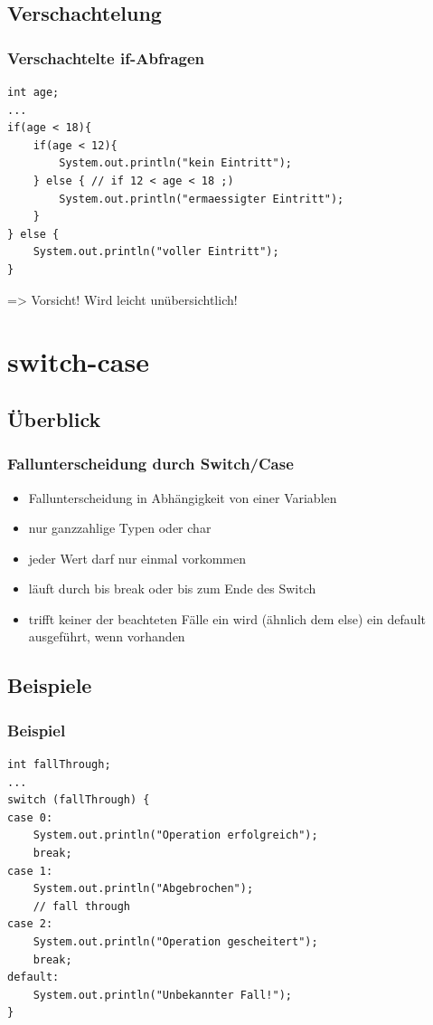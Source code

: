 \documentclass[final]{beamer}
\begin{document}
\subsection{Verschachtelung}
\begin{frame}[containsverbatim]
	\frametitle{Verschachtelte if-Abfragen}
	\begin{lstlisting}
int age;
...
if(age < 18){
	if(age < 12){
		System.out.println("kein Eintritt");
	} else { // if 12 < age < 18 ;)
		System.out.println("ermaessigter Eintritt");
	}
} else {
	System.out.println("voller Eintritt");
}
	\end{lstlisting}
	=> Vorsicht! Wird leicht unübersichtlich!
\end{frame}

\section{switch-case}
\subsection{Überblick}
\begin{frame}[containsverbatim]
	\frametitle{Fallunterscheidung durch Switch/Case}
	\begin{itemize}
		\item{Fallunterscheidung in Abhängigkeit von einer Variablen}
		\item{nur ganzzahlige Typen oder char}
		\item{jeder Wert darf nur einmal vorkommen}
		\item{läuft durch bis break oder bis zum Ende des Switch}
		\item{trifft keiner der beachteten Fälle ein wird (ähnlich dem else) ein default ausgeführt, wenn vorhanden}
	\end{itemize}
\end{frame}


\subsection{Beispiele}
\begin{frame}[containsverbatim]
	\frametitle{Beispiel}
	\begin{lstlisting}
int fallThrough;
...
switch (fallThrough) {
case 0:
	System.out.println("Operation erfolgreich");
	break;
case 1:
	System.out.println("Abgebrochen");
	// fall through
case 2:
	System.out.println("Operation gescheitert");
	break;
default:
	System.out.println("Unbekannter Fall!");
}
	\end{lstlisting}
\end{frame}
\end{document}

